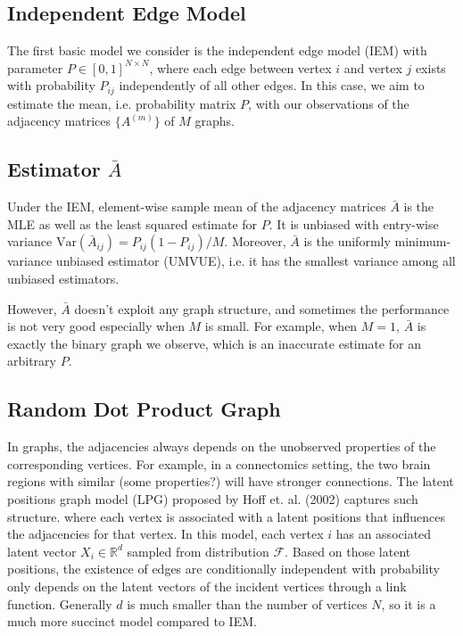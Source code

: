 \documentclass[a4paper]{article}
\begin{document}
\subsection{Independent Edge Model}
The first basic model we consider is the independent edge model (IEM) with parameter $P \in [0,1]^{N\times N}$\cite{bollobas2007phase}, where each edge between vertex $i$ and vertex $j$ exists with probability $P_{ij}$ independently of all other edges. In this case, we aim to estimate the mean, i.e. probability matrix $P$, with our observations of the adjacency matrices $\{A^{(m)}\}$ of $M$ graphs.



\subsection{Estimator $\bar{A}$}
Under the IEM, element-wise sample mean of the adjacency matrices $\bar{A}$ is the MLE as well as the least squared estimate for $P$. It is unbiased with entry-wise variance $\mathrm{Var}(\bar{A}_{ij}) = P_{ij} (1-P_{ij})/M$. Moreover, $\bar{A}$ is the uniformly minimum-variance unbiased estimator (UMVUE), i.e. it has the smallest variance among all unbiased estimators.

However, $\bar{A}$ doesn't exploit any graph structure, and sometimes the performance is not very good especially when $M$ is small. For example, when $M=1$, $\bar{A}$ is exactly the binary graph we observe, which is an inaccurate estimate for an arbitrary $P$.



\subsection{Random Dot Product Graph}
In graphs, the adjacencies always depends on the unobserved properties of the corresponding vertices. For example, in a connectomics setting, the two brain regions with similar (some properties?) will have stronger connections.
The latent positions graph model (LPG) proposed by Hoff et. al. (2002) \cite{hoff2002latent} captures such structure. where each vertex is associated with a latent positions that influences the adjacencies for that vertex.
In this model, each vertex $i$ has an associated latent vector $X_i \in \mathbb{R}^d$ sampled from distribution $\mathcal{F}$. Based on those latent positions, the existence of edges are conditionally independent with probability only depends on the latent vectors of the incident vertices through a link function. Generally $d$ is much smaller than the number of vertices $N$, so it is a much more succinct model compared to IEM.
\end{document}
